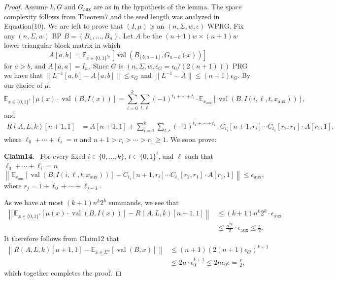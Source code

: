 \documentclass[10pt,a4paper]{article}
\newenvironment{authorclaim}[1]{\par\medskip\noindent\textbf{#1.}\ }{\par\medskip}
\begin{document}
\begin{proof}
Assume $k,G$ and $G_{\mathrm{aux}}$ are as in the hypothesis of the lemma. The space complexity follows from Theorem7 and the seed length was analyzed in Equation(10). We are left to prove that $(I,\mu)$ is an $(n,\Sigma,w,\epsilon)$ WPRG. Fix any $(n,\Sigma,w)$ BP $B=(B_1,\ldots,B_n)$. Let $A$ be the $(n+1)w\times(n+1)w$ lower triangular block matrix in which
\[A[a,b]=\mathbb E_{x\in\{0,1\}^{s_0}}[\operatorname{val}(B_{[b,a-1]},G_{a-b}(x))]\]
for $a>b$, and $A[a,a]=I_w$. Since $G$ is $(n,\Sigma,w,\epsilon_G=\epsilon_0/(2(n+1)))$ PRG we have that $\|L^{-1}[a,b]-A[a,b]\|\le\epsilon_G$ and $\|L^{-1}-A\|\le(n+1)\epsilon_G$. By our choice of $\mu$,
\[\mathbb E_{x\in\{0,1\}^s}[\mu(x)\cdot\operatorname{val}(B,I(x))]=\sum_{i=0}^k\sum_{t,\ell}(-1)^{t_1+\cdots+t_i}\cdot\mathbb E_{x_{\mathrm{aux}}}[\operatorname{val}(B,I(i,\ell,t,x_{\mathrm{aux}}))],\]
and
\begin{align*}
R(A,L,k)[n+1,1]&=A[n+1,1]+\sum_{i=1}^k\sum_{t,r}(-1)^{t_1+\cdots+t_i}\cdot C_{t_i}[n+1,r_i]\cdots C_{t_1}[r_2,r_1]\cdot A[r_1,1],
\end{align*}
where $\ell_0+\cdots+\ell_i=n$ and $n+1>r_i>\cdots>r_1\ge1$. We soon prove:
\begin{authorclaim}{Claim14}
For every fixed $i\in\{0,\ldots,k\}$, $t\in\{0,1\}^i$, and $\ell$ such that $\ell_0+\cdots+\ell_i=n$
\[\left\|\mathbb E_{x_{\mathrm{aux}}}[\operatorname{val}(B,I(i,\ell,t,x_{\mathrm{aux}}))]-C_{t_i}[n+1,r_i]\cdots C_{t_1}[r_2,r_1]\cdot A[r_1,1]\right\|\le\epsilon_{\mathrm{aux}},\]
where $r_j=1+\ell_0+\cdots+\ell_{j-1}$.
\end{authorclaim}
As we have at most $(k+1)n^k2^k$ summands, we see that
\begin{align*}
\left\|\mathbb E_{x\in\{0,1\}^s}[\mu(x)\cdot\operatorname{val}(B,I(x))]-R(A,L,k)[n+1,1]\right\|
&\le(k+1)n^k2^k\cdot\epsilon_{\mathrm{aux}}\\
&\le\frac{n^{2k}}2\cdot\epsilon_{\mathrm{aux}}\le\frac\epsilon2.
\end{align*}
It therefore follows from Claim12 that
\begin{align*}
\left\|R(A,L,k)[n+1,1]-\mathbb E_{x\in\Sigma^n}[\operatorname{val}(B,x)]\right\|
&\le(n+1)(2(n+1)\epsilon_G)^{k+1}\\
&\le2n\cdot\epsilon_0^{k+1}\le2n\epsilon_0\epsilon=\frac\epsilon2,
\end{align*}
which together completes the proof.
\end{proof}
\end{document}
